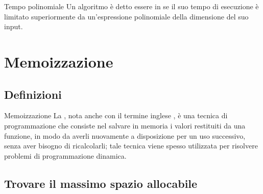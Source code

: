 \documentclass[a4paper, 12pt]{report}
\begin{document}
    \begin{frameddefn}{Tempo polinomiale}
        Un algoritmo è detto essere in  se il suo tempo di esecuzione è limitato superiormente da un'espressione polinomiale della dimensione del suo input.
    \end{frameddefn}

    \section{Memoizzazione}

    \subsection{Definizioni}

    \begin{frameddefn}{Memoizzazione}
        La , nota anche con il termine inglese , è una tecnica di programmazione che consiste nel salvare in memoria i valori restituiti da una funzione, in modo da averli nuovamente a disposizione per un uso successivo, senza aver bisogno di ricalcolarli; tale tecnica viene spesso utilizzata per risolvere problemi di programmazione dinamica.
    \end{frameddefn}

    \subsection{Trovare il massimo spazio allocabile}
\end{document}

